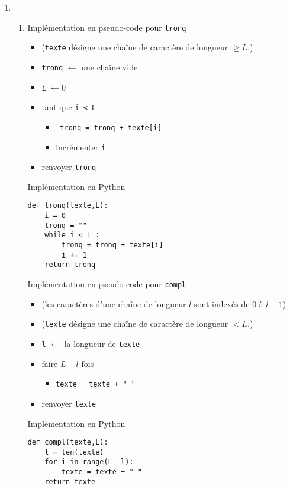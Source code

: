 \begin{enumerate}
 \item 
 \begin{enumerate}
  \item  Implémentation en pseudo-code pour \verb|tronq|
\begin{itemize}
 \item (\verb|texte| désigne une chaîne de caractère de longueur $\geq L$.)
 \item \verb|tronq| $\longleftarrow$ une chaîne vide
 \item \verb|i| $\longleftarrow 0$
 \item  tant que \verb|i < L|
   \begin{itemize}
    \item \verb| tronq = tronq + texte[i]|
    \item incrémenter \verb|i|
   \end{itemize}
 \item renvoyer \verb|tronq|
\end{itemize}
Implémentation en Python
\begin{verbatim}
def tronq(texte,L):
    i = 0
    tronq = ""
    while i < L :
        tronq = tronq + texte[i]
        i += 1
    return tronq
\end{verbatim}

Implémentation en pseudo-code pour \verb|compl|
\begin{itemize}
 \item (les caractères d'une chaîne de longueur $l$ sont indexés de $0$ à $l-1$)
 \item (\verb|texte| désigne une chaîne de caractère de longueur $< L$.)
 \item \verb|l| $\longleftarrow$ la longueur de \verb|texte|
 \item faire $L - l$ fois
   \begin{itemize}
    \item \verb|texte| = \verb|texte + " "| 
   \end{itemize}
 \item renvoyer \verb|texte|
\end{itemize}
Implémentation en Python
\begin{verbatim}
def compl(texte,L):
    l = len(texte)
    for i in range(L -l):
        texte = texte + " "
    return texte
\end{verbatim}


\end{enumerate}
\end{enumerate}
